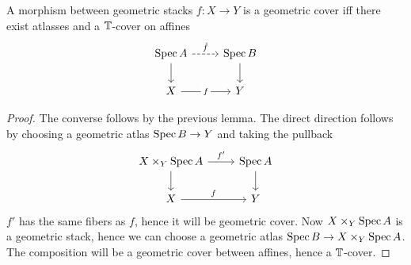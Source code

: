 \documentclass{article}
\begin{document}
\begin{lemma}
    A morphism between geometric stacks $f : X \to Y$ is a geometric cover iff there exist atlasses and a $\mathbb{T}$-cover on affines 
    \[\begin{tikzcd}
    	{\Spec A} & {\Spec B} \\
    	X & Y
    	\arrow["{\hat f}", dashed, from=1-1, to=1-2]
    	\arrow[from=1-1, to=2-1]
    	\arrow[from=1-2, to=2-2]
    	\arrow["f"{description}, from=2-1, to=2-2]
    \end{tikzcd}\]
\end{lemma}
\begin{proof}
	The converse follows by the previous lemma. The direct direction follows by choosing a geometric atlas $\operatorname{Spec} B \to Y$ and taking the pullback %
	\[\begin{tikzcd}
		{X \times_Y \Spec A} & {\Spec A} \\
		X & Y
		\arrow["{f'}", from=1-1, to=1-2]
		\arrow[from=1-1, to=2-1]
		\arrow[from=1-2, to=2-2]
		\arrow["f", from=2-1, to=2-2]
	\end{tikzcd}\]
$f'$ has the same fibers as $f$, hence it will be geometric cover. Now $X \times_Y \operatorname{Spec} A$ is a geometric stack, hence we can choose a geometric atlas $\operatorname{Spec} B \to X \times_Y \operatorname{Spec} A$. The composition will be a geometric cover between affines, hence a $\mathbb{T}$-cover.
\end{proof}
\end{document}
